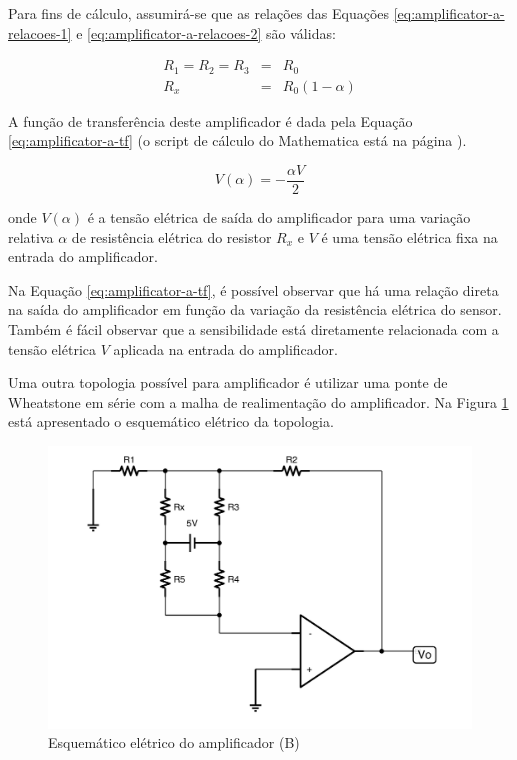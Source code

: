 \documentclass[a4paper]{instrumentacao}
\begin{document}
Para fins de cálculo, assumirá-se que as relações das Equações \ref{eq:amplificator-a-relacoes-1} e \ref{eq:amplificator-a-relacoes-2} são válidas:

\begin{eqnarray}
	R_1 = R_2 = R_3 &=& R_0 \label{eq:amplificator-a-relacoes-1} \\
	R_x &=& R_0(1-\alpha) 	\label{eq:amplificator-a-relacoes-2} 
\end{eqnarray}

A função de transferência\cite{ti-amplificador} deste amplificador é dada pela Equação \ref{eq:amplificator-a-tf} (o script de cálculo do Mathematica está na página \pageref{att:amplificadores}).

\begin{equation}
	V(\alpha) = -\frac{\alpha  V}{2}
	\label{eq:amplificator-a-tf}
\end{equation}

\noindent onde $V(\alpha)$ é a tensão elétrica de saída do amplificador para uma variação relativa $\alpha$ de resistência elétrica do resistor $R_x$ e $V$ é uma tensão elétrica fixa na entrada do amplificador.

Na Equação \ref{eq:amplificator-a-tf}, é possível observar que há uma relação direta na saída do amplificador em função da variação da resistência elétrica do sensor. Também é fácil observar que a sensibilidade está diretamente relacionada com a tensão elétrica $V$ aplicada na entrada do amplificador.


Uma outra topologia possível para amplificador é utilizar uma ponte de Wheatstone em série com a malha de realimentação do amplificador. Na Figura \ref{fig:amplificador-b} está apresentado o esquemático elétrico da topologia.

\begin{figure}[H]
\center
\includegraphics[width=\textwidth]{Amplificador-B.pdf}
\caption{Esquemático elétrico do amplificador (B)}
\label{fig:amplificador-b}
\end{figure}
\end{document}
